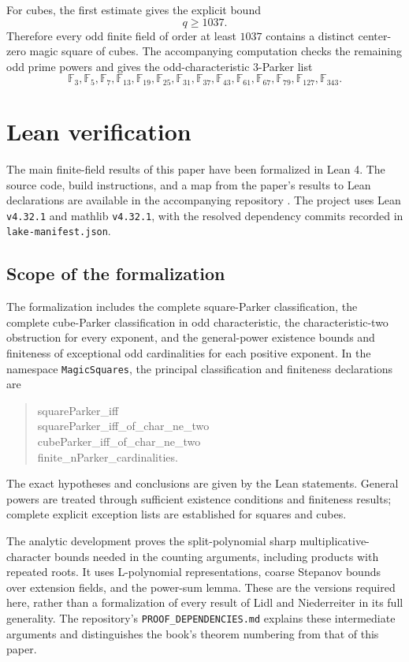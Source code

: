 \documentclass{article}
\newcommand{\F}{\mathbb F}
\theoremstyle{definition}
\numberwithin{equation}{section}
\begin{document}
For cubes, the first estimate gives the explicit bound
\[
q\geq 1037.
\]
Therefore every odd finite field of order at least \(1037\) contains a distinct
center-zero magic square of cubes.  The accompanying computation checks the
remaining odd prime powers and gives the odd-characteristic \(3\)-Parker list
\[
\boxed{
\F_3,
\F_5,
\F_7,
\F_{13},
\F_{19},
\F_{25},
\F_{31},
\F_{37},
\F_{43},
\F_{61},
\F_{67},
\F_{79},
\F_{127},
\F_{343}.
}
\]

\section{Lean verification}
\label{sec:lean-verification}

The main finite-field results of this paper have been formalized in Lean 4.
The source code, build instructions, and a map from the paper's results to
Lean declarations are available in the accompanying repository
\cite{magicSquaresLeanRepo}. The project uses Lean \texttt{v4.32.1} and
mathlib \texttt{v4.32.1}, with the resolved dependency commits recorded in
\texttt{lake-manifest.json}.

\subsection{Scope of the formalization}

The formalization includes the complete square-Parker classification, the
complete cube-Parker classification in odd characteristic, the
characteristic-two obstruction for every exponent, and the general-power
existence bounds and finiteness of exceptional odd cardinalities for each
positive exponent. In the namespace \texttt{MagicSquares}, the principal
classification and finiteness declarations are
\begin{quote}
\ttfamily
squareParker\_iff\\
squareParker\_iff\_of\_char\_ne\_two\\
cubeParker\_iff\_of\_char\_ne\_two\\
finite\_nParker\_cardinalities.
\end{quote}
The exact hypotheses and conclusions are given by the Lean statements.
General powers are treated through sufficient existence conditions and
finiteness results; complete explicit exception lists are established for
squares and cubes.

The analytic development proves the split-polynomial sharp
multiplicative-character bounds needed in the counting arguments, including
products with repeated roots. It uses L-polynomial representations,
coarse Stepanov bounds over extension fields, and the power-sum lemma.
These are the versions required here, rather than a formalization of every
result of Lidl and Niederreiter \cite{LidlNiederreiterFiniteFields} in its full
generality. The repository's \texttt{PROOF\_DEPENDENCIES.md} explains these
intermediate arguments and distinguishes the book's theorem numbering from
that of this paper.
\end{document}
